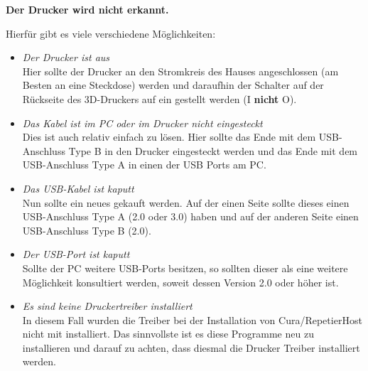 \documentclass[11pt,a4paper]{scrartcl}
\begin{document}
\begin{description}
\item \textbf{Der Drucker wird nicht erkannt.}\\
Hierfür gibt es viele verschiedene Möglichkeiten:
\begin{itemize}
\item \textit{Der Drucker ist aus}\\
Hier sollte der Drucker an den Stromkreis des Hauses angeschlossen (am Besten an eine Steckdose) werden und daraufhin der Schalter auf der Rückseite des 3D-Druckers auf ein gestellt werden (I \textbf{nicht} O).
\item \textit{Das Kabel ist im PC oder im Drucker nicht eingesteckt}\\
Dies ist auch relativ einfach zu lösen. Hier sollte das Ende mit dem USB-Anschluss Type B in den Drucker eingesteckt werden und das Ende mit dem USB-Anschluss Type A in einen der USB Ports am PC.
\item \textit{Das USB-Kabel ist kaputt}\\
Nun sollte ein neues gekauft werden. Auf der einen Seite sollte dieses einen USB-Anschluss Type A (2.0 oder 3.0) haben und auf der anderen Seite einen USB-Anschluss Type B (2.0).
\item \textit{Der USB-Port ist kaputt}\\
Sollte der PC weitere USB-Ports besitzen, so sollten dieser als eine weitere Möglichkeit konsultiert werden, soweit dessen Version 2.0 oder höher ist.
\item \textit{Es sind keine Druckertreiber installiert}\\
In diesem Fall wurden die Treiber bei der Installation von Cura/RepetierHost nicht mit installiert. Das sinnvollste ist es diese Programme neu zu installieren und darauf zu achten, dass diesmal die Drucker Treiber installiert werden.
\end{itemize}
\end{description}
\end{document}
